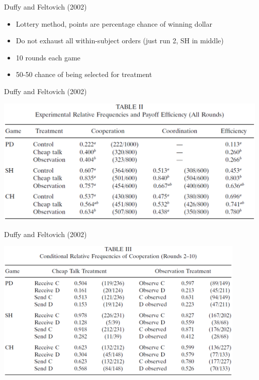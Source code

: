 \documentclass{beamer}
\begin{document}
\begin{frame}{Duffy and Feltovich (2002)}
\begin{card}
\begin{itemize}
	\item Lottery method, points are percentage chance of winning dollar
	\item Do not exhaust all within-subject orders (just run 2, SH in middle)
	\item 10 rounds each game
	\item 50-50 chance of being selected for treatment
\end{itemize}
\end{card}
\end{frame}


\begin{frame}{Duffy and Feltovich (2002)}
\begin{card}
\begin{center}\includegraphics[width=0.99\textwidth]{./i/df2002tbl2.eps}\end{center}
\end{card}
\end{frame}

\begin{frame}{Duffy and Feltovich (2002)}
\begin{card}
\begin{center}\includegraphics[width=0.9\textwidth]{./i/df2002tb3.eps}\end{center}
\end{card}
\end{frame}
\end{document}
